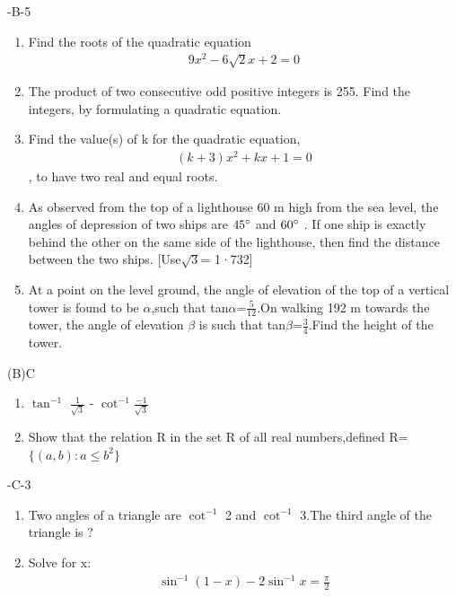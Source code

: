 \documentclass{article}
\begin{document}
 \pagebreak
 -B-5
 \begin{enumerate}
     \item Find the roots of the quadratic equation 
     \begin{align}
         9x^2-6\sqrt{2}x+2=0
         \end{align}
         \item The product of two consecutive odd positive integers is 255. Find the integers, by formulating a quadratic equation.
         \item Find the value(s) of k for the quadratic equation,
         \begin{align}
             (k+3)x^2+kx+1=0 
         \end{align} , to have two real and equal roots.
         \item As observed from the top of a lighthouse 60 m high from the sea level, the angles of depression of two ships are $45\degree$ and $60\degree$ . If one ship is exactly behind the other on the same side of the lighthouse, then find the distance between the two ships. [Use$\sqrt{3}$= 1·732]
         \item At a point on the level ground, the angle of elevation of the top of a vertical tower is found to be $\alpha$,such that tan$\alpha$=$\frac{5}{12}$.On walking 192 m towards the tower, the angle of elevation $\beta$ is such that tan$\beta$=$\frac{3}{4}$.Find the height of the tower. 
 \end{enumerate}
 (B)C
 \begin{enumerate}
     \item $\tan^{-1}$ $\frac{1}{\sqrt{3}}$ - $\cot^{-1}$$\frac{-1}{\sqrt{3}}$
     \item Show that the relation R in the set R of all real numbers,defined R= $\{(a,b):a\leq b^2\}$
     \end{enumerate}
     -C-3
     \begin{enumerate}
         \item Two angles of a triangle are $\cot^{-1}$ 2 and $\cot^{-1}$ 3.The third angle of the triangle is ?
         \item Solve for x:
         \begin{align}
          \sin^{-1}(1-x)-2 \sin^{-1} x=\frac{\pi}{2} 
         \end{align}
         \end{enumerate}
\end{document}
